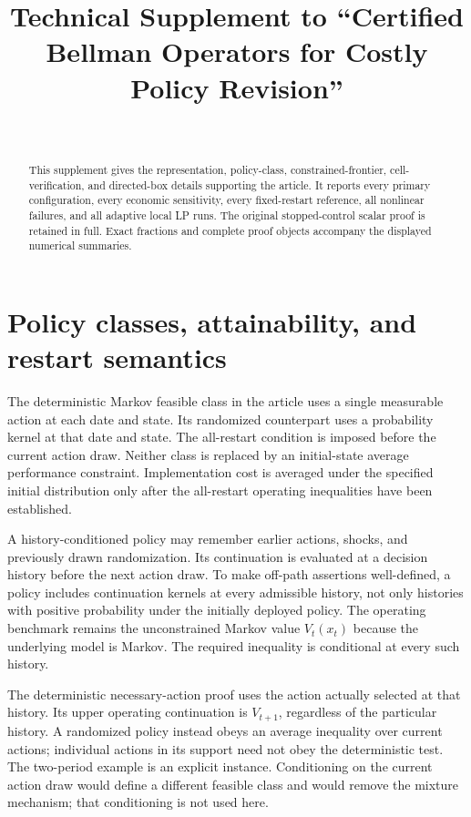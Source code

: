 
\begin{frontmatter}
\title{Technical Supplement to ``Certified Bellman Operators for Costly Policy Revision''}
\begin{aug}\author[id=au1,addressref={add1}]{~}\address[id=add1]{}\end{aug}
\begin{abstract}This supplement gives the representation, policy-class, constrained-frontier, cell-verification, and directed-box details supporting the article. It reports every primary configuration, every economic sensitivity, every fixed-restart reference, all nonlinear failures, and all adaptive local LP runs. The original stopped-control scalar proof is retained in full. Exact fractions and complete proof objects accompany the displayed numerical summaries.\end{abstract}
\end{frontmatter}

\section{Policy classes, attainability, and restart semantics}
The deterministic Markov feasible class in the article uses a single measurable action at each date and state. Its randomized counterpart uses a probability kernel at that date and state. The all-restart condition is imposed before the current action draw. Neither class is replaced by an initial-state average performance constraint. Implementation cost is averaged under the specified initial distribution only after the all-restart operating inequalities have been established.

A history-conditioned policy may remember earlier actions, shocks, and previously drawn randomization. Its continuation is evaluated at a decision history before the next action draw. To make off-path assertions well-defined, a policy includes continuation kernels at every admissible history, not only histories with positive probability under the initially deployed policy. The operating benchmark remains the unconstrained Markov value $V_t(x_t)$ because the underlying model is Markov. The required inequality is conditional at every such history.

The deterministic necessary-action proof uses the action actually selected at that history. Its upper operating continuation is $V_{t+1}$, regardless of the particular history. A randomized policy instead obeys an average inequality over current actions; individual actions in its support need not obey the deterministic test. The two-period example is an explicit instance. Conditioning on the current action draw would define a different feasible class and would remove the mixture mechanism; that conditioning is not used here.

